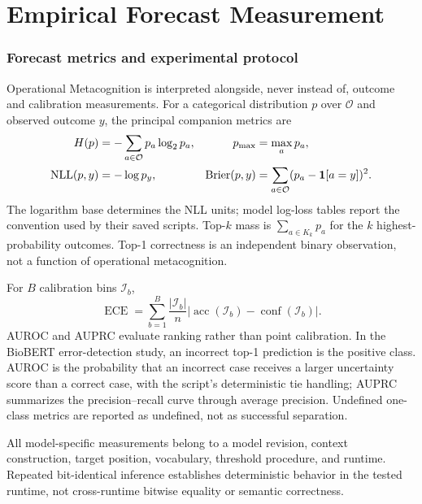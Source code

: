 \clearpage
\part{Empirical Forecast Measurement}
\label{part:evidence}

\section{Forecast metrics and experimental protocol}
Operational Metacognition is interpreted alongside, never instead of, outcome and calibration measurements. For a categorical distribution $p$ over $\mathcal O$ and observed outcome $y$, the principal companion metrics are
\begin{align}
H(p)&=-\sum_{a\in\mathcal O}p_a\log_2p_a, &
p_{\max}&=\max_ap_a,\\
\operatorname{NLL}(p,y)&=-\log p_y, &
\operatorname{Brier}(p,y)&=\sum_{a\in\mathcal O}(p_a-\mathbf 1[a=y])^2.
\end{align}
The logarithm base determines the NLL units; model log-loss tables report the convention used by their saved scripts. Top-$k$ mass is $\sum_{a\in K_k}p_a$ for the $k$ highest-probability outcomes. Top-1 correctness is an independent binary observation, not a function of operational metacognition.

For $B$ calibration bins $\mathcal I_b$,
\begin{equation}
\operatorname{ECE}=\sum_{b=1}^{B}\frac{|\mathcal I_b|}{n}
\left|\operatorname{acc}(\mathcal I_b)-\operatorname{conf}(\mathcal I_b)\right|.
\label{eq:ece}
\end{equation}
AUROC and AUPRC evaluate ranking rather than point calibration. In the BioBERT error-detection study, an incorrect top-1 prediction is the positive class. AUROC is the probability that an incorrect case receives a larger uncertainty score than a correct case, with the script's deterministic tie handling; AUPRC summarizes the precision--recall curve through average precision. Undefined one-class metrics are reported as undefined, not as successful separation.

All model-specific measurements belong to a model revision, context construction, target position, vocabulary, threshold procedure, and runtime. Repeated bit-identical inference establishes deterministic behavior in the tested runtime, not cross-runtime bitwise equality or semantic correctness.

